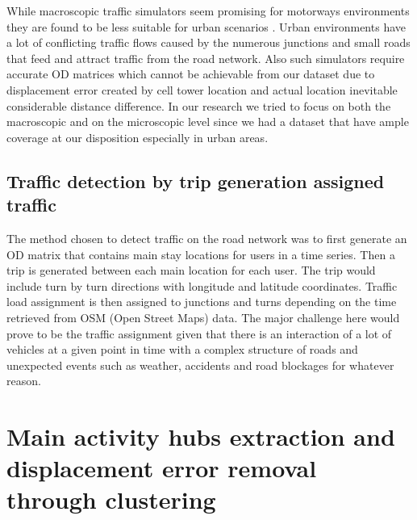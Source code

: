 \documentclass[12pt, a4paper]{report}
\theoremstyle{definition}
\theoremstyle{definition}%
\theoremstyle{definition}%
\theoremstyle{definition}%
\theoremstyle{definition}%
\theoremstyle{definition}%
\begin{document}
While macroscopic traffic simulators seem promising for motorways environments they are found to be less suitable for urban scenarios \cite{Bazghandi2012}. Urban environments have a lot of conflicting traffic flows caused by the numerous junctions and small roads that feed and attract traffic from the road network. Also such simulators require accurate OD matrices which cannot be achievable from our dataset due to displacement error created by cell tower location and actual location inevitable considerable distance difference. In our research we tried to focus on both the macroscopic and on the microscopic level since we had a dataset that have ample coverage at our disposition especially in urban areas.    


\subsection{Traffic detection by trip generation assigned traffic} \label{subsection:methodology:trip_generation}
The method chosen to detect traffic on the road network was to first generate an OD matrix that contains main stay locations for users in a time series. Then a trip is generated between each main location for each user. The trip would include turn by turn directions with longitude and latitude coordinates. Traffic load assignment is then assigned to junctions and turns depending on the time retrieved from OSM (Open Street Maps) data. The major challenge here would prove to be the traffic assignment given that there is an interaction of a lot of vehicles at a given point in time with a complex structure of roads and unexpected events such as weather, accidents and road blockages for whatever reason. 


\section{Main activity hubs extraction and displacement error removal through clustering} \label{section:methodology:clustering}
\end{document}
